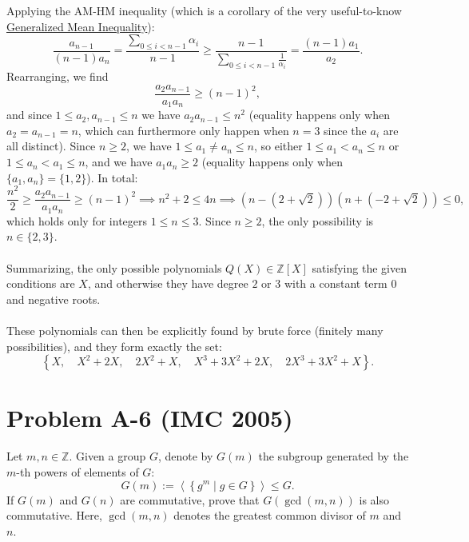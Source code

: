 \documentclass[11pt, a4paper, oneside]{article}
\newcommand{\problem}[1][]{\section{#1} \hfill \par}
\theoremstyle{remark}
\theoremstyle{lemma}
\begin{document}
Applying the AM-HM inequality (which is a corollary of the very useful-to-know \href{https://en.wikipedia.org/wiki/Generalized_mean#Generalized_mean_inequality}{Generalized Mean Inequality}):
\[
    \frac{a_{n-1}}{(n-1)a_n} = \frac{\sum_{0\leq i<n-1}\alpha_i}{n-1} \geq \frac{n-1}{\sum_{0\leq i<n-1}\frac{1}{\alpha_i}} = \frac{(n-1)a_1}{a_{2}}.
\]
Rearranging, we find
\[
    \frac{a_2 a_{n-1}}{a_1 a_n} \geq (n-1)^2,
\]
and since $1 \leq a_2, a_{n-1} \leq n$ we have $a_2 a_{n-1} \leq n^2$ (equality happens only when $a_2 = a_{n-1} = n$, which can furthermore only happen when $n = 3$ since the $a_i$ are all distinct). Since $n \geq 2$, we have $1 \leq a_1 \neq a_n \leq n$, so either $1 \leq a_1 < a_n\leq n$ or $1 \leq a_n < a_1\leq n$, and we have $a_1 a_n \geq 2$ (equality happens only when $\{a_1, a_n\} = \{1, 2\}$). In total:
\[
\frac{n^2}{2} \geq \frac{a_2 a_{n-1}}{a_1 a_n} \geq (n-1)^2 \implies n^2 + 2 \leq 4n \implies \left(n - \left(2 + \sqrt{2}\right)\right) \left(n + \left(-2 + \sqrt{2}\right)\right) \leq 0,
\]
which holds only for integers \(1 \leq n \leq 3\). Since $n \geq 2$, the only possibility is $n \in \{2, 3\}$.
\\\\
Summarizing, the only possible polynomials \( Q(X)\in\mathbb{Z}[X] \) satisfying the given conditions are \( X \), and otherwise they have degree \( 2 \) or \( 3 \) with a constant term \( 0 \) and negative roots.
\\\\
These polynomials can then be explicitly found by brute force (finitely many possibilities), and they form exactly the set:
\[
    \left\{X,\quad X^2 + 2X, \quad 2X^2 + X,\quad X^3 + 3X^2 + 2X,\quad 2X^3 + 3X^2 + X\right\}.
\]
\newpage
\problem[Problem A-6 (IMC 2005)]
Let $m,n\in\mathbb{Z}$. Given a group \( G \), denote by \( G(m) \) the subgroup generated by the \( m \)-th powers of elements of \( G \):
\[
G(m):=\left\langle\left\{g^m \mid g\in G\right\}\right\rangle\leq G.
\]
If \( G(m) \) and \( G(n) \) are commutative, prove that \( G(\gcd(m, n)) \) is also commutative. Here, \( \gcd(m, n) \) denotes the greatest common divisor of \( m \) and \( n \).
\end{document}
